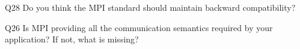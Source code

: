 \begin{description}%
\item{Q28} Do you think the MPI standard should maintain backward compatibility?%
\item{Q26} Is MPI providing all the communication semantics required by your application? If not, what is missing?%
\end{description}%
